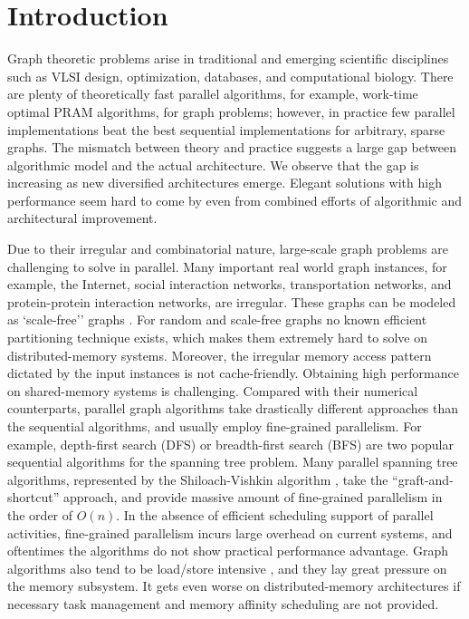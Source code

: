 
\section{Introduction}
\label{s:intr}

 Graph theoretic problems arise in traditional and emerging scientific disciplines such as VLSI design, optimization, databases, and computational biology. There are plenty of theoretically fast parallel algorithms, for example, work-time optimal PRAM algorithms, for graph problems; however, in
 practice few parallel implementations beat the best sequential implementations for arbitrary, sparse
 graphs. The mismatch between theory and practice suggests a large gap between algorithmic model and the actual architecture. We observe that the gap is increasing as new diversified architectures emerge. Elegant solutions with high performance seem hard to come by even from combined efforts of algorithmic and architectural improvement. 

Due to their irregular and combinatorial nature, large-scale graph problems are challenging to solve in parallel. Many important real world graph instances, for example, the Internet, social interaction networks, transportation networks, and protein-protein interaction networks, are irregular. These graphs can be modeled as `scale-free'' graphs \cite{CZF04}. For random and scale-free graphs no known efficient partitioning technique exists, which makes them extremely hard to solve on distributed-memory systems. Moreover, the irregular memory access pattern dictated by the input instances is not cache-friendly. Obtaining high performance on shared-memory systems is challenging. Compared with their numerical counterparts, parallel graph algorithms take drastically different approaches than the sequential algorithms, and usually employ fine-grained parallelism. For example, depth-first search (DFS) or breadth-first search (BFS) are two popular sequential algorithms for the spanning tree problem. Many parallel spanning tree algorithms,  represented by the Shiloach-Vishkin algorithm \cite{SV82}, take the ``graft-and-shortcut'' approach, and provide massive amount of fine-grained parallelism in the order of $O(n)$. In the absence of efficient scheduling support of parallel activities, fine-grained parallelism incurs large overhead on current systems, and oftentimes the algorithms do not show practical performance advantage. Graph algorithms also tend to be load/store intensive \cite{G06}, and they lay great pressure on the memory subsystem. It gets even worse on distributed-memory architectures if necessary task management and memory affinity scheduling are not provided.  
 

